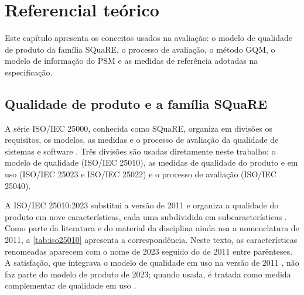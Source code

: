 \chapter{Referencial teórico}
\label{cap:referencial}

Este capítulo apresenta os conceitos usados na avaliação: o modelo de qualidade de produto da família SQuaRE, o processo de avaliação, o método GQM, o modelo de informação do PSM e as medidas de referência adotadas na especificação.

\section{Qualidade de produto e a família SQuaRE}
\label{sec:square}

A série ISO/IEC 25000, conhecida como SQuaRE, organiza em divisões os requisitos, os modelos, as medidas e o processo de avaliação da qualidade de sistemas e software \cite{iso25000}. Três divisões são usadas diretamente neste trabalho: o modelo de qualidade (ISO/IEC 25010), as medidas de qualidade do produto e em uso (ISO/IEC 25023 e ISO/IEC 25022) e o processo de avaliação (ISO/IEC 25040).

A ISO/IEC 25010:2023 substitui a versão de 2011 e organiza a qualidade do produto em nove características, cada uma subdividida em subcaracterísticas \cite{iso25010_2023}. Como parte da literatura e do material da disciplina ainda usa a nomenclatura de 2011, a \autoref{tab:iso25010} apresenta a correspondência. Neste texto, as características renomeadas aparecem com o nome de 2023 seguido do de 2011 entre parênteses. A satisfação, que integrava o modelo de qualidade em uso na versão de 2011 \cite{iso25010_2011}, não faz parte do modelo de produto de 2023; quando usada, é tratada como medida complementar de qualidade em uso \cite{iso25022}.

